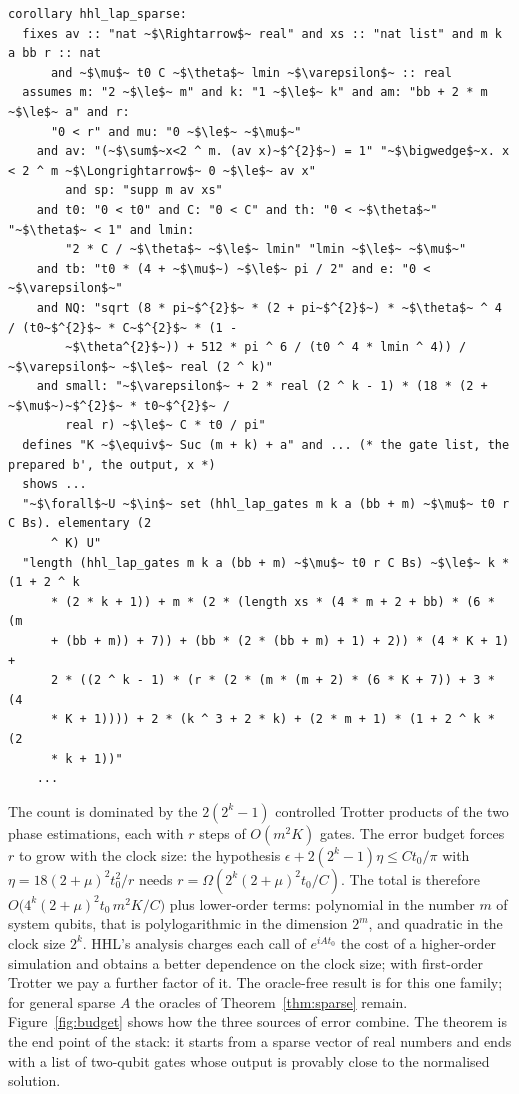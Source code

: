 \begin{lstlisting}[float=tp,caption={Theorem~\ref{thm:lap} with its hypotheses (abridged: the definitions of the gate list, the prepared right-hand side, the output and the solution, and four of the six conclusions, are elided)},label={lst:lap}]
corollary hhl_lap_sparse:
  fixes av :: "nat ~$\Rightarrow$~ real" and xs :: "nat list" and m k a bb r :: nat
      and ~$\mu$~ t0 C ~$\theta$~ lmin ~$\varepsilon$~ :: real
  assumes m: "2 ~$\le$~ m" and k: "1 ~$\le$~ k" and am: "bb + 2 * m ~$\le$~ a" and r:
      "0 < r" and mu: "0 ~$\le$~ ~$\mu$~"
    and av: "(~$\sum$~x<2 ^ m. (av x)~$^{2}$~) = 1" "~$\bigwedge$~x. x < 2 ^ m ~$\Longrightarrow$~ 0 ~$\le$~ av x"
        and sp: "supp m av xs"
    and t0: "0 < t0" and C: "0 < C" and th: "0 < ~$\theta$~" "~$\theta$~ < 1" and lmin:
        "2 * C / ~$\theta$~ ~$\le$~ lmin" "lmin ~$\le$~ ~$\mu$~"
    and tb: "t0 * (4 + ~$\mu$~) ~$\le$~ pi / 2" and e: "0 < ~$\varepsilon$~"
    and NQ: "sqrt (8 * pi~$^{2}$~ * (2 + pi~$^{2}$~) * ~$\theta$~ ^ 4 / (t0~$^{2}$~ * C~$^{2}$~ * (1 -
        ~$\theta^{2}$~)) + 512 * pi ^ 6 / (t0 ^ 4 * lmin ^ 4)) / ~$\varepsilon$~ ~$\le$~ real (2 ^ k)"
    and small: "~$\varepsilon$~ + 2 * real (2 ^ k - 1) * (18 * (2 + ~$\mu$~)~$^{2}$~ * t0~$^{2}$~ /
        real r) ~$\le$~ C * t0 / pi"
  defines "K ~$\equiv$~ Suc (m + k) + a" and ... (* the gate list, the prepared b', the output, x *)
  shows ...
  "~$\forall$~U ~$\in$~ set (hhl_lap_gates m k a (bb + m) ~$\mu$~ t0 r C Bs). elementary (2
      ^ K) U"
  "length (hhl_lap_gates m k a (bb + m) ~$\mu$~ t0 r C Bs) ~$\le$~ k * (1 + 2 ^ k
      * (2 * k + 1)) + m * (2 * (length xs * (4 * m + 2 + bb) * (6 * (m
      + (bb + m)) + 7)) + (bb * (2 * (bb + m) + 1) + 2)) * (4 * K + 1) +
      2 * ((2 ^ k - 1) * (r * (2 * (m * (m + 2) * (6 * K + 7)) + 3 * (4
      * K + 1)))) + 2 * (k ^ 3 + 2 * k) + (2 * m + 1) * (1 + 2 ^ k * (2
      * k + 1))"
    ...
\end{lstlisting}

The count is dominated by the $2(2^k-1)$ controlled Trotter products of the two phase estimations,
each with $r$ steps of $O(m^2K)$ gates. The error budget forces $r$ to grow with the clock size: the
hypothesis $\epsilon+2(2^k-1)\eta\le Ct_0/\pi$ with $\eta=18(2+\mu)^2t_0^2/r$ needs
$r=\Omega(2^k(2+\mu)^2t_0/C)$. The total is therefore $O\bigl(4^k(2+\mu)^2t_0\,m^2K/C\bigr)$ plus
lower-order terms: polynomial in the number $m$ of system qubits, that is polylogarithmic in the
dimension $2^m$, and quadratic in the clock size $2^k$. HHL's analysis charges each call of $e^{iAt_0}$
the cost of a higher-order simulation and obtains a better dependence on the clock size; with
first-order Trotter we pay a further factor of it. The oracle-free result is for this one family; for
general sparse $A$ the oracles of Theorem~\ref{thm:sparse} remain. Figure~\ref{fig:budget} shows how the
three sources of error combine. The theorem is the end point of the stack: it starts from a sparse vector of real numbers and
ends with a list of two-qubit gates whose output is provably close to the normalised solution.

